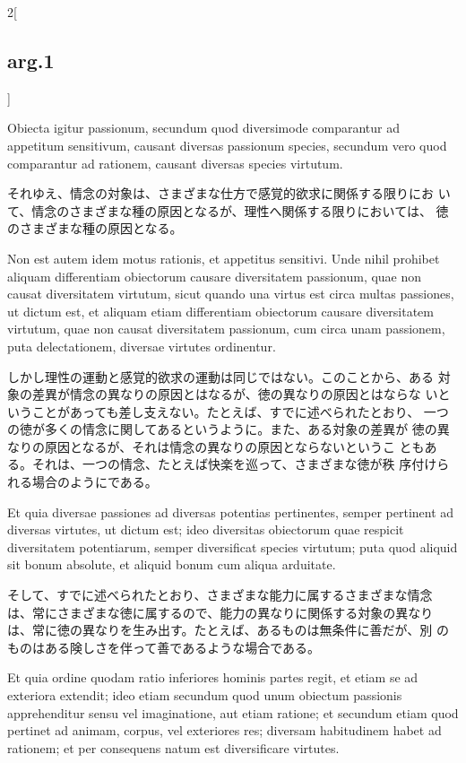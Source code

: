 \documentclass[paper=a4paper,fontsize=10pt,jafontsize=9pt,titlepage]{jlreq}
\begin{document}
\begin{paracol}{2}[\subsection{arg.1}]
\switchcolumn*

Obiecta igitur passionum, secundum quod diversimode comparantur ad
 appetitum sensitivum, causant diversas passionum species, secundum
 vero quod comparantur ad rationem, causant diversas species
 virtutum.

\switchcolumn

それゆえ、情念の対象は、さまざまな仕方で感覚的欲求に関係する限りにお
 いて、情念のさまざまな種の原因となるが、理性へ関係する限りにおいては、
 徳のさまざまな種の原因となる。

\switchcolumn*

Non est autem idem motus rationis, et appetitus sensitivi. Unde nihil
 prohibet aliquam differentiam obiectorum causare diversitatem
 passionum, quae non causat diversitatem virtutum, sicut quando una
 virtus est circa multas passiones, ut dictum est, et aliquam etiam
 differentiam obiectorum causare diversitatem virtutum, quae non
 causat diversitatem passionum, cum circa unam passionem, puta
 delectationem, diversae virtutes ordinentur.

\switchcolumn

しかし理性の運動と感覚的欲求の運動は同じではない。このことから、ある
 対象の差異が情念の異なりの原因とはなるが、徳の異なりの原因とはならな
 いということがあっても差し支えない。たとえば、すでに述べられたとおり、
 一つの徳が多くの情念に関してあるというように。また、ある対象の差異が
 徳の異なりの原因となるが、それは情念の異なりの原因とならないというこ
 ともある。それは、一つの情念、たとえば快楽を巡って、さまざまな徳が秩
 序付けられる場合のようにである。

\switchcolumn*

Et quia diversae passiones ad diversas potentias pertinentes, semper
 pertinent ad diversas virtutes, ut dictum est; ideo diversitas
 obiectorum quae respicit diversitatem potentiarum, semper
 diversificat species virtutum; puta quod aliquid sit bonum absolute,
 et aliquid bonum cum aliqua arduitate.

\switchcolumn

そして、すでに述べられたとおり、さまざまな能力に属するさまざまな情念
 は、常にさまざまな徳に属するので、能力の異なりに関係する対象の異なり
 は、常に徳の異なりを生み出す。たとえば、あるものは無条件に善だが、別
 のものはある険しさを伴って善であるような場合である。

\switchcolumn*

Et quia ordine quodam ratio inferiores hominis partes regit, et etiam
 se ad exteriora extendit; ideo etiam secundum quod unum obiectum
 passionis apprehenditur sensu vel imaginatione, aut etiam ratione; et
 secundum etiam quod pertinet ad animam, corpus, vel exteriores res;
 diversam habitudinem habet ad rationem; et per consequens natum est
 diversificare virtutes.


\end{paracol}
\end{document}
